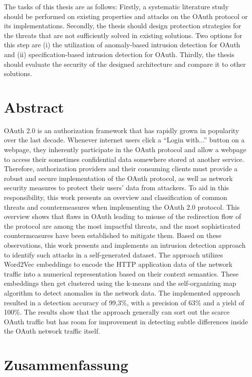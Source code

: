 \documentclass[
    fontsize=12pt,
    headings=small,
    parskip=half,           %
    bibliography=totoc,
    numbers=noenddot,       %
    open=any,               %
    ]{scrreprt}
\begin{document}
The tasks of this thesis are as follows: Firstly, a systematic literature study should be performed on existing properties and attacks on the OAuth protocol or its implementations. Secondly, the thesis should design protection strategies for the threats that are not sufficiently solved in existing solutions. Two options for this step are (i) the utilization of anomaly-based intrusion detection for OAuth and (ii) specification-based intrusion detection for OAuth. Thirdly, the thesis should evaluate the security of the designed architecture and compare it to other solutions.

\chapter*{Abstract}
OAuth 2.0 is an authorization framework that has rapidly grown in popularity over the last decade. Whenever internet users click a ``Login with...'' button on a webpage, they inherently participate in the OAuth protocol and allow a webpage to access their sometimes confidential data somewhere stored at another service. Therefore, authorization providers and their consuming clients must provide a robust and secure implementation of the OAuth protocol, as well as network security measures to protect their users' data from attackers. To aid in this responsibility, this work presents an overview and classification of common threats and countermeasures when implementing the OAuth 2.0 protocol. This overview shows that flaws in OAuth leading to misuse of the redirection flow of the protocol are among the most impactful threats, and the most sophisticated countermeasures have been established to mitigate them. Based on these observations, this work presents and implements an intrusion detection approach to identify such attacks in a self-generated dataset. The approach utilizes Word2Vec embeddings to encode the HTTP application data of the network traffic into a numerical representation based on their context semantics. These embeddings then get clustered using the k-means and the self-organizing map algorithm to detect anomalies in the network data. The implemented approach resulted in a detection accuracy of 99,3\%, with a precision of 63\% and a yield of 100\%. The results show that the approach generally can sort out the scarce OAuth traffic but has room for improvement in detecting subtle differences inside the OAuth network traffic itself.

\chapter*{Zusammenfassung}
\end{document}
